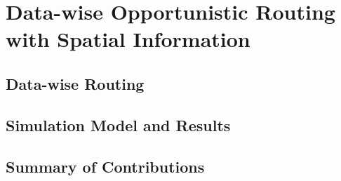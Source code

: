 \chapter{Data-wise Opportunistic Routing with Spatial Information}
\label{dorsi}


\section{Data-wise Routing}
\label{dorsi:Data-wise Routing}



\section{Simulation Model and Results}
\label{dorsi:Simulation Model and Results}




\section{Summary of Contributions}
\label{dorsi:Summary of Contributions}






